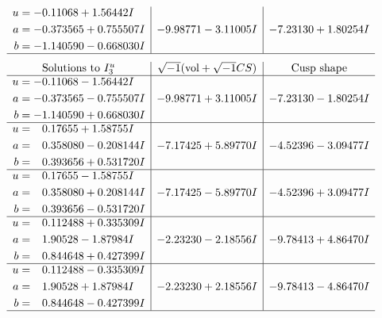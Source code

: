 \documentclass[1p]{elsarticle_modified}
\theoremstyle{definition}
\newcommand{\I}{\sqrt{-1}}
\begin{document}
$$\begin{array}{c|c|c}
\begin{aligned}
u &= -0.11068 + 1.56442 I \\
a &= -0.373565 + 0.755507 I \\
b &= -1.140590 - 0.668030 I\end{aligned}
 & -9.98771 - 3.11005 I & -7.23130 + 1.80254 I\\
 \hline 
 \end{array}$$\newpage$$\begin{array}{c|c|c}  
\text{Solutions to }I^u_{3}& \I (\text{vol} + \sqrt{-1}CS) & \text{Cusp shape}\\
 \hline 
\begin{aligned}
u &= -0.11068 - 1.56442 I \\
a &= -0.373565 - 0.755507 I \\
b &= -1.140590 + 0.668030 I\end{aligned}
 & -9.98771 + 3.11005 I & -7.23130 - 1.80254 I \\ \hline\begin{aligned}
u &= \phantom{-}0.17655 + 1.58755 I \\
a &= \phantom{-}0.358080 - 0.208144 I \\
b &= \phantom{-}0.393656 + 0.531720 I\end{aligned}
 & -7.17425 + 5.89770 I & -4.52396 - 3.09477 I \\ \hline\begin{aligned}
u &= \phantom{-}0.17655 - 1.58755 I \\
a &= \phantom{-}0.358080 + 0.208144 I \\
b &= \phantom{-}0.393656 - 0.531720 I\end{aligned}
 & -7.17425 - 5.89770 I & -4.52396 + 3.09477 I \\ \hline\begin{aligned}
u &= \phantom{-}0.112488 + 0.335309 I \\
a &= \phantom{-}1.90528 - 1.87984 I \\
b &= \phantom{-}0.844648 + 0.427399 I\end{aligned}
 & -2.23230 - 2.18556 I & -9.78413 + 4.86470 I \\ \hline\begin{aligned}
u &= \phantom{-}0.112488 - 0.335309 I \\
a &= \phantom{-}1.90528 + 1.87984 I \\
b &= \phantom{-}0.844648 - 0.427399 I\end{aligned}
 & -2.23230 + 2.18556 I & -9.78413 - 4.86470 I\\
 \hline 
 \end{array}$$\newpage
\end{document}
